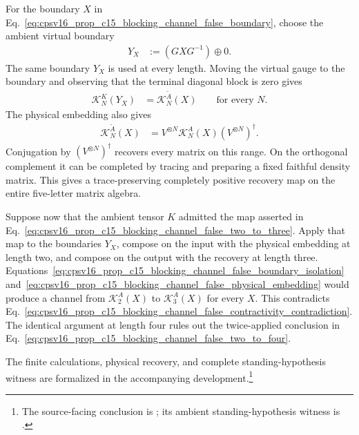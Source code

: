 \documentclass{article}
\begin{document}
For the boundary $X$ in
Eq.~\ref{eq:cpsv16_prop_c15_blocking_channel_false_boundary}, choose the
ambient virtual boundary
\begin{align}
    Y_X
        &:=(GXG^{-1})\oplus0.
    \label{eq:cpsv16_prop_c15_blocking_channel_false_ambient_boundary}
\end{align}
The same boundary $Y_X$ is used at every length. Moving the virtual gauge to
the boundary and observing that the terminal diagonal block is zero gives
\begin{align}
    \mathcal K_N^K(Y_X)
        &=\mathcal K_N^{\widetilde A}(X)
        \qquad\text{for every }N.
    \label{eq:cpsv16_prop_c15_blocking_channel_false_boundary_isolation}
\end{align}
The physical embedding also gives
\begin{align}
    \mathcal K_N^{\widetilde A}(X)
        &=V^{\otimes N}\mathcal K_N^A(X)(V^{\otimes N})^\dagger.
    \label{eq:cpsv16_prop_c15_blocking_channel_false_physical_embedding}
\end{align}
Conjugation by $(V^{\otimes N})^\dagger$ recovers every matrix on this range.
On the orthogonal complement it can be completed by tracing and preparing a
fixed faithful density matrix. This gives a trace-preserving completely
positive recovery map on the entire five-letter matrix algebra.

Suppose now that the ambient tensor $K$ admitted the map asserted in
Eq.~\ref{eq:cpsv16_prop_c15_blocking_channel_false_two_to_three}. Apply that
map to the boundaries $Y_X$, compose on the input with the physical embedding
at length two, and compose on the output with the recovery at length three.
Equations~\ref{eq:cpsv16_prop_c15_blocking_channel_false_boundary_isolation}
and~\ref{eq:cpsv16_prop_c15_blocking_channel_false_physical_embedding} would
produce a channel from $\mathcal K_2^A(X)$ to $\mathcal K_3^A(X)$ for every
$X$. This contradicts
Eq.~\ref{eq:cpsv16_prop_c15_blocking_channel_false_contractivity_contradiction}.
The identical argument at length four rules out the twice-applied conclusion
in Eq.~\ref{eq:cpsv16_prop_c15_blocking_channel_false_two_to_four}.

The finite calculations, physical recovery, and complete standing-hypothesis
witness are formalized in the accompanying development.\footnote{The
source-facing conclusion is
;
its ambient standing-hypothesis witness is
.}
\end{document}

